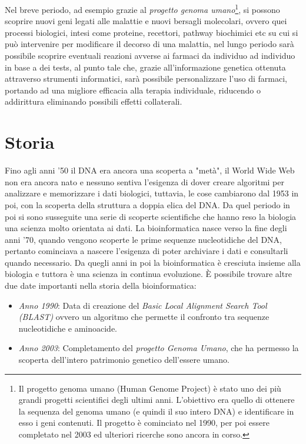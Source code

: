 Nel breve periodo, ad esempio grazie al \textit{progetto genoma umano}\footnote{Il progetto genoma umano (Human Genome Project) è stato uno dei più grandi progetti scientifici degli ultimi anni. L'obiettivo era quello di ottenere la sequenza del genoma umano (e quindi il suo intero DNA) e identificare in esso i geni contenuti. Il progetto è cominciato nel 1990, per poi essere completato nel 2003 ed ulteriori ricerche sono ancora in corso.}, si possono scoprire nuovi geni legati alle malattie e nuovi bersagli molecolari, ovvero quei processi biologici, intesi come proteine, recettori, pathway biochimici etc su cui si può intervenire per modificare il decorso di una malattia, nel lungo periodo sarà possibile scoprire eventuali reazioni avverse ai farmaci da individuo ad individuo in base a dei tests, al punto tale che, grazie all'informazione genetica ottenuta attraverso strumenti informatici, sarà possibile personalizzare l'uso di farmaci, portando ad una migliore efficacia alla terapia individuale, riducendo o addirittura eliminando possibili effetti collaterali.


\section{Storia}
Fino agli anni '50 il DNA era ancora una scoperta a "metà", il World Wide Web non era ancora nato e nessuno sentiva l'esigenza di dover creare algoritmi per analizzare e memorizzare i dati biologici, tuttavia, le cose cambiarono dal 1953 in poi, con la scoperta della struttura a doppia elica del DNA. Da quel periodo in poi si sono susseguite una serie di scoperte scientifiche che hanno reso la biologia una scienza molto orientata ai dati.
\newline
La bioinformatica nasce verso la fine degli anni '70, quando vengono scoperte le prime sequenze nucleotidiche del DNA, pertanto cominciava a nascere l'esigenza di poter archiviare i dati e consultarli quando necessario. Da quegli anni in poi la bioinformatica è cresciuta insieme alla biologia e tuttora è una scienza in continua evoluzione.
\newline
\`E possibile trovare altre due date importanti nella storia della bioinformatica:
\begin{itemize}
	\item \textit{Anno 1990}: Data di creazione del \textit{Basic Local Alignment Search Tool (BLAST)}\cite{BLAST} ovvero un algoritmo che permette il confronto tra sequenze nucleotidiche e aminoacide.
	\item \textit{Anno 2003}: Completamento del \textit{progetto Genoma Umano}, che ha permesso la scoperta dell'intero patrimonio genetico dell'essere umano.
\end{itemize}


